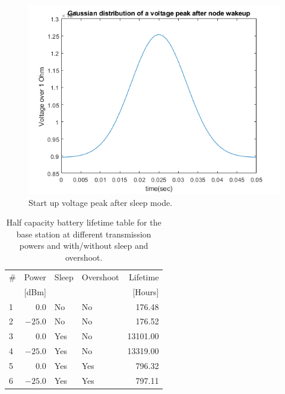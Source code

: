 \begin{figure}[h]
	\centering
	\includegraphics[width=\linewidth]{theory/energyCalculations/fig/gaussianDistributionsOfVoltagePeak.png}
	\caption{Start up voltage peak after sleep mode.}
	\label{fig:gaussianDistributionsOfVoltagePeak}
\end{figure}

\begin{table}[h]
	\centering
	\begin{tabularx}{\linewidth}{|l|r|l|X|r|}
		\hline
		\#	& Power		& Sleep	& Overshoot	& Lifetime	\\
		    & [dBm]		& 		& 		& [Hours]	\\ \hline
		1	& $0.0$		& No	& No	& 176.48	\\ \hline
		2	& $-25.0$	& No	& No	& 176.52	\\ \hline
		3	& $0.0$		& Yes	& No	& 13101.00	\\ \hline
		4	& $-25.0$	& Yes	& No	& 13319.00	\\ \hline
		5	& $0.0$		& Yes	& Yes	& 796.32	\\ \hline
		6	& $-25.0$	& Yes	& Yes	& 797.11	\\ \hline
	\end{tabularx}
	\caption{Half capacity battery lifetime table for the base station at different transmission powers and with/without sleep and overshoot.}
	\label{tab:halfLifetimeBaseStation}
\end{table}